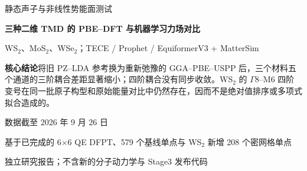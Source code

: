 \documentclass[UTF8,a4paper,11pt,fontset=mac]{ctexart}
\newcommand{\PhiC}{\Phi_{122}}
\newcommand{\cubunit}{\mathrm{meV}/(\mathring{\mathrm A}^{3}\mathrm{amu}^{3/2})}
\newcommand{\quartunit}{\mathrm{meV}/(\mathring{\mathrm A}^{4}\mathrm{amu}^{2})}
\begin{document}
\begin{titlepage}
\color{ink}
\vspace*{27mm}
{\Large 静态声子与非线性势能面测试\par}
\vspace{8mm}
{\Huge\bfseries 三种二维 TMD 的 PBE--DFT 与机器学习力场对比\par}
\vspace{9mm}
{\Large WS$_2$、MoS$_2$、WSe$_2$；TECE / Prophet / EquiformerV3 + MatterSim\par}
\vspace{12mm}
\noindent\colorbox{light}{\parbox{0.94\textwidth}{\vspace{4mm}
\textbf{核心结论}\quad 将旧 PZ--LDA 参考换为重新弛豫的 GGA--PBE--USPP 后，三个材料五个通道的三阶耦合差距显著缩小；四阶耦合没有同步收敛。WS$_2$ 的 $\Gamma8$--M6 四阶变号在同一批原子构型和原始能量对比中仍然存在，因而不是绝对值排序或多项式拟合造成的。
\vspace{4mm}}}
\vfill
{\large 数据截至 2026 年 9 月 26 日\par}
\vspace{3mm}
{\normalsize 基于已完成的 6$\times$6 QE DFPT、579 个基线单点与 WS$_2$ 新增 208 个密网格单点\par}
\vspace{2mm}
{\small 独立研究报告；不含新的分子动力学与 Stage3 发布代码\par}
\end{titlepage}

\begin{abstract}
延续本科论文与此前测试报告的“声子谱及本征矢—模式对—二维势能面—非线性系数—数值可靠性—计算成本”分析顺序，本报告定量比较三种 1H 二维过渡金属二硫化物中 QE PZ--LDA、重新计算的 QE GGA--PBE、以及 TECE、Prophet、EquiformerV3 三条 Stage1 + MatterSim Stage2 路线。三种材料的 PBE 弛豫和 6$\times$6$\times$1 DFPT 均完成；各取原有筛选的五个 $\Gamma$--$q$--$(-q)$ 物理通道，计算中心 5$\times$5 高精度势能面，并对每种材料最强通道计算 9$\times$9 窗口。全部 579 个 QE 单点具有完整能量、原子力与来源校验。五通道三阶强度 $|\PhiC|$ 的 TECE+MatterSim 平均绝对误差从 LDA 参考的 10.33、12.54、3.94 降为 PBE 参考的 6.10、4.33、1.18 $\cubunit$；但 WS$_2$、MoS$_2$ 的四阶有符号误差略增。WS$_2$ $\Gamma8$--M6 在同一 PBE 结构、同一模式位移的 25 个构型上仍为 QE $-1.414$、MatterSim $+1.930$ $\quartunit$。新增的 WS$_2$ $\Gamma8$--M9 同构型 17$\times$17 位移网格表明：在固定宽窗口下，QE 四阶从 9$\times$9 到 17$\times$17 仅变动 $+0.152\%$，MatterSim 变动 $+4.917\%$；在固定中心窗口下分别变动 $+0.025\%$、$-0.392\%$。新增三条同模型全流程及固定DFT基诊断共完成5274个MLFF构型：TECE全流程五通道四阶MAE在WS$_2$、MoS$_2$和WSe$_2$中分别为0.911、1.626和0.145；固定PBE构型下TECE复现WS$_2$ M6的负四阶（$-1.425$）。另以GRACE、DPA和Eqnorm完成1629个相同PBE构型的Stage2复测：GRACE恢复WS$_2$ M6负号但高估幅度，DPA和Eqnorm同样给出错误正号，因此问题不是MatterSim独有。本结果支持以 PBE 参考开展后续筛选验证，同时要求对四阶物理量单独校准；不能用谐波频率精度替代高阶势能面验证。
\end{abstract}
\end{document}
